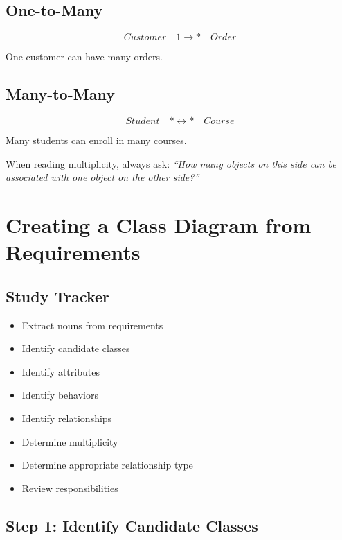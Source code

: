 \documentclass[11pt,a4paper]{article}
\newcommand{\checkitem}{$\square$}
\begin{document}
\subsection{One-to-Many}

\[
Customer \quad 1 \longrightarrow * \quad Order
\]

One customer can have many orders.

\subsection{Many-to-Many}

\[
Student \quad * \longleftrightarrow * \quad Course
\]

Many students can enroll in many courses.

\begin{exambox}
When reading multiplicity, always ask:
\textit{``How many objects on this side can be associated with one object on
the other side?''}
\end{exambox}

\section{Creating a Class Diagram from Requirements}

\subsection{Study Tracker}

\begin{itemize}[label=\checkitem]
    \item Extract nouns from requirements
    \item Identify candidate classes
    \item Identify attributes
    \item Identify behaviors
    \item Identify relationships
    \item Determine multiplicity
    \item Determine appropriate relationship type
    \item Review responsibilities
\end{itemize}

\subsection{Step 1: Identify Candidate Classes}
\end{document}
